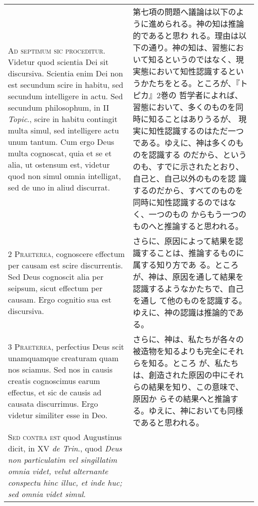 \documentclass[10pt]{jsarticle} %
\begin{document}
\begin{longtable}{p{21em}p{21em}}


{\huge A}{\scshape d septimum sic proceditur}. Videtur quod scientia Dei
sit discursiva. Scientia enim Dei non est secundum scire in habitu, sed
secundum intelligere in actu. Sed secundum philosophum, in II {\itshape
Topic}., scire in habitu contingit multa simul, sed intelligere actu
unum tantum. Cum ergo Deus multa cognoscat, quia et se et alia, ut
ostensum est, videtur quod non simul omnia intelligat, sed de uno in
aliud discurrat.

&


第七項の問題へ議論は以下のように進められる。神の知は推論的であると思わ
れる。理由は以下の通り。神の知は、習態において知るというのではなく、現
実態において知性認識するというかたちをとる。ところが、『トピカ』2巻の
哲学者によれば、習態において、多くのものを同時に知ることはありうるが、
現実に知性認識するのはただ一つである。ゆえに、神は多くのものを認識する
のだから、というのも、すでに示されたとおり、自己と、自己以外のものを認
識するのだから、すべてのものを同時に知性認識するのではなく、一つのもの
からもう一つのものへと推論すると思われる。

\\


{\scshape 2 Praeterea}, cognoscere effectum per causam
est scire discurrentis. Sed Deus cognoscit alia per seipsum, sicut
effectum per causam. Ergo cognitio sua est discursiva.

&

さらに、原因によって結果を認識することは、推論するものに属する知り方であ
 る。ところが、神は、原因を通して結果を認識するようなかたちで、自己を通し
 て他のものを認識する。ゆえに、神の認識は推論的である。

\\


{\scshape 3 Praeterea}, perfectius Deus scit unamquamque
creaturam quam nos sciamus. Sed nos in causis creatis cognoscimus earum
effectus, et sic de causis ad causata discurrimus. Ergo videtur
similiter esse in Deo.

&

さらに、神は、私たちが各々の被造物を知るよりも完全にそれらを知る。ところ
が、私たちは、創造された原因の中にそれらの結果を知り、この意味で、原因か
らその結果へと推論する。ゆえに、神においても同様であると思われる。

\\


{\scshape Sed contra est} quod Augustinus dicit, in XV {\itshape de
Trin}., quod {\itshape Deus non particulatim vel singillatim omnia
videt, velut alternante conspectu hinc illuc, et inde huc; sed omnia
videt simul}.


\end{longtable}
\end{document}
